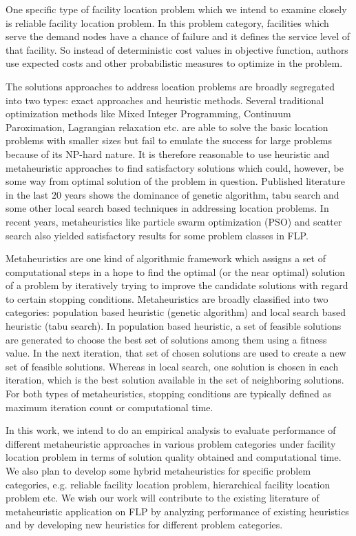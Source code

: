 \documentclass[12pt]{article}
\begin{document}
One specific type of facility location problem which we intend to examine closely is reliable facility location problem. In this problem category, facilities which serve the demand nodes have a chance of failure \cite{Lim2010} and it defines the service level of that facility. So instead of deterministic cost values in objective function, authors use expected costs and other probabilistic measures to optimize in the problem.


The solutions approaches to address location problems are broadly segregated into two types: exact approaches and heuristic methods. Several traditional optimization methods like Mixed Integer Programming, Continuum Paroximation, Lagrangian relaxation etc. \cite{Cui2010} are able to solve the basic location problems with smaller sizes but fail to emulate the success for large problems because of its NP-hard nature. It is therefore reasonable to use heuristic and metaheuristic approaches to find satisfactory solutions which could, however, be some way from optimal solution of the problem in question. Published literature in the last $20$ years shows the dominance of genetic algorithm, tabu search and some other local search based techniques in addressing location problems. In recent years, metaheuristics like particle swarm optimization (PSO) and scatter search also yielded satisfactory results for some problem classes in FLP.  


Metaheuristics are one kind of algorithmic framework which assigns a set of computational steps in a hope to find the optimal (or the near optimal) solution of a problem by iteratively trying to improve the candidate solutions with regard to certain stopping conditions. Metaheuristics are broadly classified into two categories:\cite{Arostegui2006} population based heuristic (genetic algorithm) and local search based heuristic (tabu search). In population based heuristic, a set of feasible solutions are generated to choose the best set of solutions among them using a fitness value. In the next iteration, that set of chosen solutions are used to create a new set of feasible solutions. Whereas in local search, one solution is chosen in each iteration, which is the best solution available in the set of neighboring solutions. For both types of metaheuristics, stopping conditions are typically defined as maximum iteration count or computational time. 

In this work, we intend to do an empirical analysis to evaluate performance of different metaheuristic approaches in various problem categories under facility location problem in terms of solution quality obtained and computational time. We also plan to develop some hybrid metaheuristics for specific problem categories, e.g. reliable facility location problem, hierarchical facility location problem etc. We wish our work will contribute to the existing literature of metaheuristic application on FLP by analyzing performance of existing heuristics and by developing new heuristics for different problem categories.  

\afterpage{\clearpage}


\end{document}
